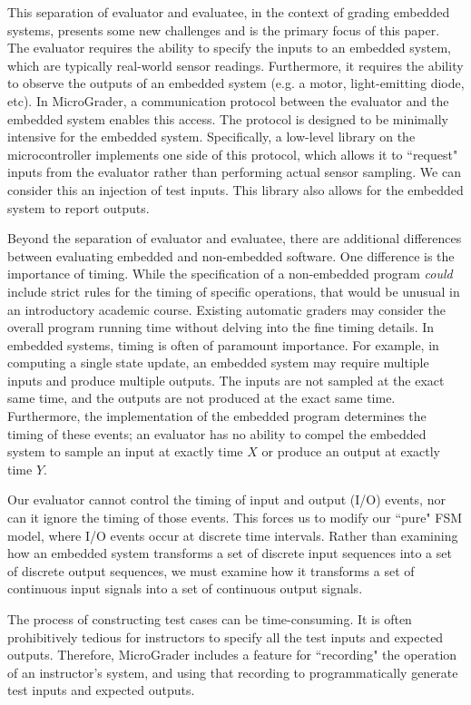\documentclass[12pt]{article}
\begin{document}
This separation of evaluator and evaluatee, in the context of grading embedded systems, presents some new challenges and is the primary focus of this paper.  The evaluator requires the ability to specify the inputs to an embedded system, which are typically real-world sensor readings.  Furthermore, it requires the ability to observe the outputs of an embedded system (e.g. a motor, light-emitting diode, etc).  In MicroGrader, a communication protocol between the evaluator and the embedded system enables this access.  The protocol is designed to be minimally intensive for the embedded system.  Specifically, a low-level library on the microcontroller implements one side of this protocol, which allows it to ``request" inputs from the evaluator rather than performing actual sensor sampling.  We can consider this an injection of test inputs.  This library also allows for the embedded system to report outputs.

Beyond the separation of evaluator and evaluatee, there are additional differences between evaluating embedded and non-embedded software.  One difference is the importance of timing.  While the specification of a non-embedded program \textit{could} include strict rules for the timing of specific operations, that would be unusual in an introductory academic course.  Existing automatic graders may consider the overall program running time without delving into the fine timing details. In embedded systems, timing is often of paramount importance.  For example, in computing a single state update, an embedded system may require multiple inputs and produce multiple outputs.  The inputs are not sampled at the exact same time, and the outputs are not produced at the exact same time.  Furthermore, the implementation of the embedded program determines the timing of these events; an evaluator has no ability to compel the embedded system to sample an input at exactly time $X$ or produce an output at exactly time $Y$.

Our evaluator cannot control the timing of input and output (I/O) events, nor can it ignore the timing of those events.  This forces us to modify our ``pure" FSM model, where I/O events occur at discrete time intervals.  Rather than examining how an embedded system transforms a set of discrete input sequences into a set of discrete output sequences, we must examine how it transforms a set of continuous input signals into a set of continuous output signals.

The process of constructing test cases can be time-consuming.  It is often prohibitively tedious for instructors to specify all the test inputs and expected outputs.  Therefore, MicroGrader includes a feature for ``recording" the operation of an instructor's system, and using that recording to programmatically generate test inputs and expected outputs. 
\end{document}
